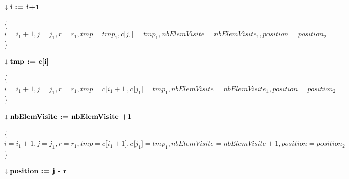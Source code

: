 	\begin{description}
		\item \textbf{$\shortdownarrow \textbf{i := i+1}$}
	\end{description}
		
	\{$i = i_1 + 1, j=j_1,r = r_1, tmp = tmp_1,c{[}j_1{]} = tmp_1, nbElemVisite=nbElemVisite_1, position=position_2$\}\\			
	
	
	\begin{description}
		\item \textbf{$\shortdownarrow \textbf{tmp := c{[}i{]}}$}
	\end{description}	
	
	\mbox{\{$i = i_1 + 1, j=j_1,r = r_1, tmp = c{[}i_1+1{]},c{[}j_1{]} = tmp_1, nbElemVisite=nbElemVisite_1, position=position_2$\}}\\	
	
	
	\begin{description}
		\item \textbf{$\shortdownarrow \textbf{nbElemVisite := nbElemVisite +1}$}
	\end{description}		
	
	\mbox{\{$i = i_1 + 1, j=j_1,r = r_1, tmp = c{[}i_1+1{]},c{[}j_1{]} = tmp_1, nbElemVisite=nbElemVisite + 1, position=position_2$\}}\\	
	
	\begin{description}
		\item \textbf{$\shortdownarrow \textbf{position := j - r}$}
	\end{description}		

